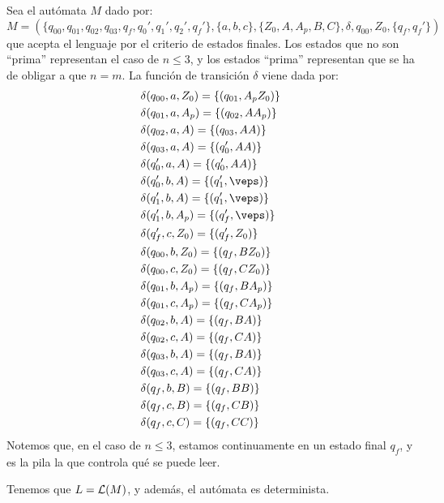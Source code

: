 \begin{ejercicio}
\begin{enumerate}
        Sea el autómata $M$ dado por:
        \begin{equation*}
            M = (\{q_{00},q_{01},q_{02},q_{03},q_f, q_0',q_1',q_2',q_f'\},\{a,b,c\},\{Z_0,A,A_p,B,C\},\delta,q_{00},Z_0,\{q_f,q_f'\})
        \end{equation*}
        que acepta el lenguaje por el criterio de estados finales. Los estados que no son ``prima'' representan el caso de $n\leq 3$, y los estados ``prima'' representan que se ha de obligar a que $n=m$.
        La función de transición $\delta$ viene dada por:
        \begin{align*}
            &\delta(q_{00},a,Z_0) = \{(q_{01},A_pZ_0)\} \\
            &\delta(q_{01},a,A_p) = \{(q_{02},AA_p)\} \\
            &\delta(q_{02},a,A) = \{(q_{03},AA)\} \\
            &\delta(q_{03},a,A) = \{(q_{0}',AA)\} \\
            &\delta(q_{0}',a,A) = \{(q_{0}',AA)\} \\
            &\delta(q_{0}',b,A) = \{(q_1',\veps)\} \\
            &\delta(q_1',b,A) = \{(q_1',\veps)\} \\
            &\delta(q_1',b,A_p) = \{(q_f',\veps)\} \\
            &\delta(q_f',c,Z_0) = \{(q_f',Z_0)\}\\
            &\delta(q_{00},b,Z_0) = \{(q_f,BZ_0)\} \\
            &\delta(q_{00},c,Z_0) = \{(q_f,CZ_0)\} \\
            &\delta(q_{01},b,A_p) = \{(q_f,BA_p)\} \\
            &\delta(q_{01},c,A_p) = \{(q_f,CA_p)\} \\
            &\delta(q_{02},b,A) = \{(q_f,BA)\} \\
            &\delta(q_{02},c,A) = \{(q_f,CA)\} \\
            &\delta(q_{03},b,A) = \{(q_f,BA)\} \\
            &\delta(q_{03},c,A) = \{(q_f,CA)\} \\
            &\delta(q_f,b,B) = \{(q_f,BB)\} \\
            &\delta(q_f,c,B) = \{(q_f,CB)\} \\
            &\delta(q_f,c,C) = \{(q_f,CC)\}
        \end{align*}
        Notemos que, en el caso de $n\leq 3$, estamos continuamente en un estado final $q_f$, y es la pila la que controla qué se puede leer.

        Tenemos que $L=\mathcal{L}(M)$, y además, el autómata es determinista.
    \end{enumerate}
\end{ejercicio}

